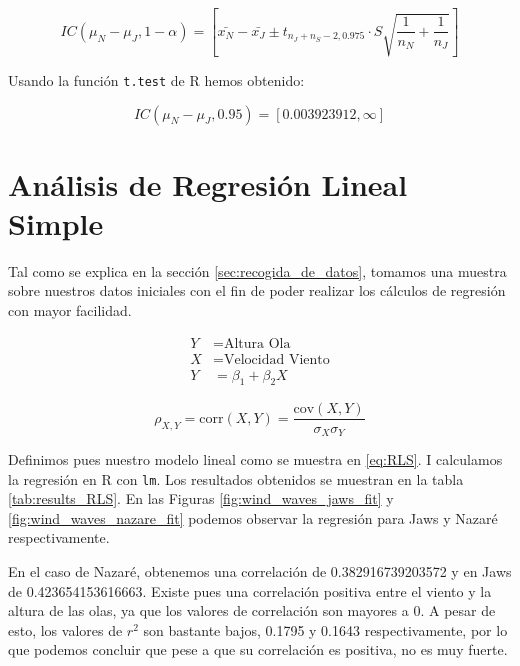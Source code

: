 %   

\begin{equation}
\label{eq:IntConfi}
    IC\left( \mu_N - \mu_J, 1-\alpha\right) =
    \left[ \bar{x_N} - \bar{x_J} \pm t_{n_J+n_S-2, 0.975} \cdot S \sqrt{
        \frac{1}{n_N}  + \frac{1}{n_J}
    }
    \right]
\end{equation}

Usando la función \texttt{t.test} de R hemos obtenido:

\[IC\left( \mu_N - \mu_J, 0.95\right) = \left[ 0.003923912,  \infty \right]\]

\section{Análisis de Regresión Lineal Simple}
\label{sec:rls}

Tal como se explica en la sección \ref{sec:recogida_de_datos}, tomamos una muestra sobre nuestros datos
iniciales con el fin de poder realizar los cálculos de regresión con mayor facilidad. %

\begin{align}
\label{eq:RLS}
    Y &= \text{Altura Ola}     \nonumber \\
    X &= \text{Velocidad Viento}     \nonumber \\
    Y &= \beta_1 + \beta_2 X 
\end{align}

\begin{equation}
\label{eq:correlation}
    \rho_{X,Y}=\mathrm{corr}(X,Y) = \frac{\mathrm{cov}(X,Y)}{\sigma_X \sigma_Y}
\end{equation}

Definimos pues nuestro modelo lineal como se muestra en \ref{eq:RLS}. I calculamos la regresión en R con
\texttt{lm}. Los resultados obtenidos se muestran en la tabla \ref{tab:results_RLS}.
En las Figuras \ref{fig:wind_waves_jaws_fit} y \ref{fig:wind_waves_nazare_fit} podemos observar la
regresión para Jaws y Nazaré respectivamente.

En el caso de Nazaré, obtenemos una correlación de 0.382916739203572 y en Jaws de 0.423654153616663. Existe
pues una correlación positiva entre el viento y la altura de las olas, ya que los valores de
correlación son mayores a 0. A pesar de esto, los valores de \(r^2\) son bastante bajos, 0.1795 y 0.1643 respectivamente, por lo que podemos concluir que pese a que su correlación es positiva, no es muy fuerte.

